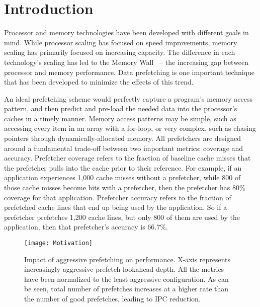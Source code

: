\section{Introduction}
\label{Introduction}

Processor and memory technologies have been developed with different
goals in mind. While processor scaling has focused on speed
improvements, memory scaling has primarily focused on increasing
capacity. The difference in each technology's scaling has led to the
Memory Wall~\cite{MemWall} -- the increasing gap between processor and
memory performance. Data prefetching is one important technique that
has been developed to minimize the effects of this trend.


An ideal prefetching scheme would perfectly capture a program's memory
access pattern, and then predict and pre-load the needed data into the
processor's caches in a timely manner.  Memory access patterns may be
simple, such as accessing every item in an array with a for-loop, or
very complex, such as chasing pointers through dynamically-allocated
memory.  %
All prefetchers are designed around a fundamental trade-off between
two important metrics: coverage and accuracy. Prefetcher coverage
refers to the fraction of baseline cache misses that the prefetcher
pulls into the cache prior to their reference.  For example, if an
application experiences 1,000 cache misses without a prefetcher, while
800 of those cache misses become hits with a prefetcher, then the
prefetcher has 80\% coverage for that application.  Prefetcher
accuracy refers to the fraction of prefetched cache lines that end up
being used by the application. So if a prefetcher prefetches 1,200
cache lines, but only 800 of them are used by the application, then
that prefetcher's accuracy is 66.7\%.


\begin{figure}[t]
\texttt{[image: Motivation]}
\caption{Impact of aggressive prefetching on performance. X-axis
  represents increasingly aggressive prefetch lookahead depth. All the
  metrics have been normalized to the least aggressive
  configuration. As can be seen, total number of prefetches increases
  at a higher rate than the number of good prefetches, leading to IPC
  reduction.}
\label{Fig:Motivation}
\end{figure}

